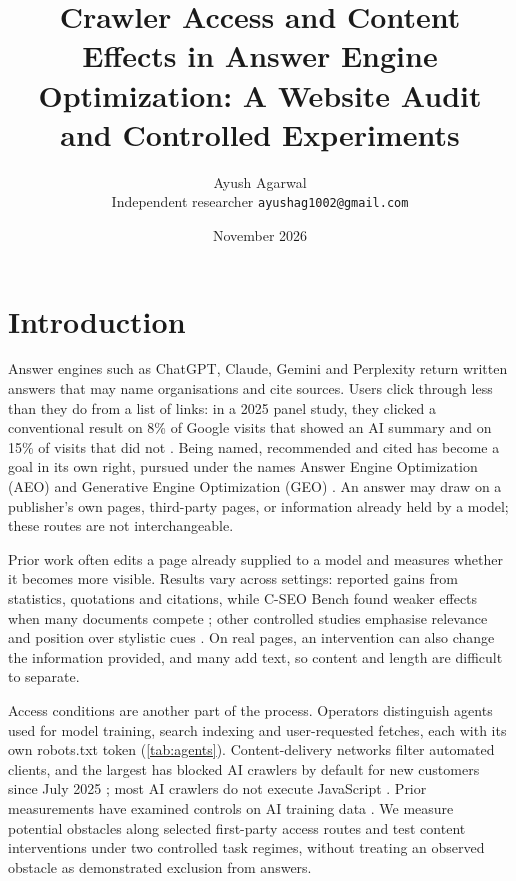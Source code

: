 \documentclass[11pt]{article}
\title{Crawler Access and Content Effects in Answer Engine Optimization: A Website Audit and Controlled Experiments}
\author{Ayush Agarwal\\ \small Independent researcher \quad \texttt{ayushag1002@gmail.com}}
\date{November 2026}
\begin{document}
\maketitle



\section{Introduction}
\label{sec:intro}

Answer engines such as ChatGPT, Claude, Gemini and Perplexity return written answers that may name organisations and
cite sources. Users click through less than they do from a list of links: in a 2025 panel study, they clicked a
conventional result on 8\% of Google visits that showed an AI summary and on 15\% of visits that did not
\citep{pew2025clicks}. Being named, recommended and cited has become a goal in its own right, pursued under the names Answer
Engine Optimization (AEO) and Generative Engine Optimization (GEO) \citep{aggarwal2024geo}. An answer may draw on a
publisher's own pages, third-party pages, or information already held by a model; these routes are not interchangeable.

Prior work often edits a page already supplied to a model and measures whether it becomes more visible. Results vary
across settings: \citet{aggarwal2024geo} reported gains from statistics, quotations and citations, while C-SEO Bench
found weaker effects when many documents compete \citep{puerto2025cseo}; other controlled studies emphasise relevance
and position over stylistic cues \citep{wan2024evidence,vishwakarma2026cited}. On real pages, an intervention can also
change the information provided, and many add text, so content and length are difficult to separate.

Access conditions are another part of the process. Operators distinguish agents used for model training, search
indexing and user-requested fetches, each with its own robots.txt token (\cref{tab:agents}). Content-delivery networks
filter automated clients, and the largest has blocked AI crawlers by default for new customers since July 2025
\citep{cloudflare2025default}; most AI crawlers do not execute JavaScript \citep{vercel2024crawler}. Prior
measurements have examined controls on AI training data
\citep{longpre2024consent,fletcher2024news,liu2025somesite}. We measure potential obstacles along selected first-party
access routes and test content interventions under two controlled task regimes, without treating an observed obstacle
as demonstrated exclusion from answers.
\end{document}
